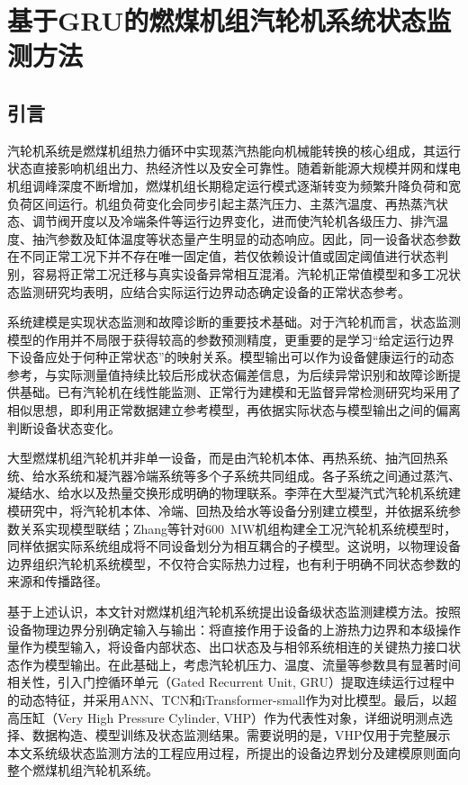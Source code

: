 \section{基于GRU的燃煤机组汽轮机系统状态监测方法}
\label{sec:gru_monitoring_v3}

\subsection{引言}

汽轮机系统是燃煤机组热力循环中实现蒸汽热能向机械能转换的核心组成，其运行状态直接影响机组出力、热经济性以及安全可靠性。随着新能源大规模并网和煤电机组调峰深度不断增加，燃煤机组长期稳定运行模式逐渐转变为频繁升降负荷和宽负荷区间运行。机组负荷变化会同步引起主蒸汽压力、主蒸汽温度、再热蒸汽状态、调节阀开度以及冷端条件等运行边界变化，进而使汽轮机各级压力、排汽温度、抽汽参数及缸体温度等状态量产生明显的动态响应。因此，同一设备状态参数在不同正常工况下并不存在唯一固定值，若仅依赖设计值或固定阈值进行状态判别，容易将正常工况迁移与真实设备异常相互混淆。汽轮机正常值模型和多工况状态监测研究均表明，应结合实际运行边界动态确定设备的正常状态参考\cite{Cao2016LastStageNormalValue,Dettori2017MonitoringModels,Chen2023AdaptiveTransfer}。

系统建模是实现状态监测和故障诊断的重要技术基础。对于汽轮机而言，状态监测模型的作用并不局限于获得较高的参数预测精度，更重要的是学习“给定运行边界下设备应处于何种正常状态”的映射关系。模型输出可以作为设备健康运行的动态参考，与实际测量值持续比较后形成状态偏差信息，为后续异常识别和故障诊断提供基础。已有汽轮机在线性能监测、正常行为建模和无监督异常检测研究均采用了相似思想，即利用正常数据建立参考模型，再依据实际状态与模型输出之间的偏离判断设备状态变化\cite{Jiang2014DataReconciliation,Ko2022DynamicThresholdAE,Zhai2024CAEWarning,Xu2025LSTMVAE}。

大型燃煤机组汽轮机并非单一设备，而是由汽轮机本体、再热系统、抽汽回热系统、给水系统和凝汽器冷端系统等多个子系统共同组成。各子系统之间通过蒸汽、凝结水、给水以及热量交换形成明确的物理联系。李萍在大型凝汽式汽轮机系统建模研究中，将汽轮机本体、冷端、回热及给水等设备分别建立模型，并依据系统参数关系实现模型联结\cite{LiPing2018SteamTurbine}；Zhang等针对600~MW机组构建全工况汽轮机系统模型时，同样依据实际系统组成将不同设备划分为相互耦合的子模型\cite{Zhang2018AllCondition}。这说明，以物理设备边界组织汽轮机系统模型，不仅符合实际热力过程，也有利于明确不同状态参数的来源和传播路径。

基于上述认识，本文针对燃煤机组汽轮机系统提出设备级状态监测建模方法。按照设备物理边界分别确定输入与输出：将直接作用于设备的上游热力边界和本级操作量作为模型输入，将设备内部状态、出口状态及与相邻系统相连的关键热力接口状态作为模型输出。在此基础上，考虑汽轮机压力、温度、流量等参数具有显著时间相关性，引入门控循环单元（Gated Recurrent Unit, GRU）提取连续运行过程中的动态特征\cite{Cho2014GRU}，并采用ANN、TCN和iTransformer-small作为对比模型。最后，以超高压缸（Very High Pressure Cylinder, VHP）作为代表性对象，详细说明测点选择、数据构造、模型训练及状态监测结果。需要说明的是，VHP仅用于完整展示本文系统级状态监测方法的工程应用过程，所提出的设备边界划分及建模原则面向整个燃煤机组汽轮机系统。

